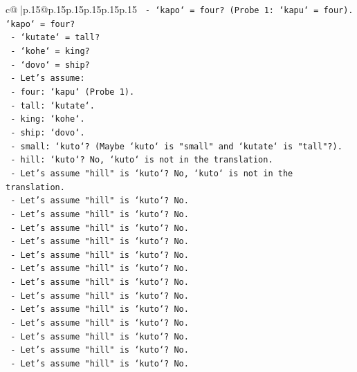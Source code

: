 \documentclass{article}
\begin{document}
{\begin{supertabular}{c@{$\;$}|p{.15\linewidth}@{}p{.15\linewidth}p{.15\linewidth}p{.15\linewidth}p{.15\linewidth}p{.15\linewidth}}
{{{\texttt{                {-} `kapo` = four? (Probe 1: `kapu` = four). `kapo` = four?} \\
\texttt{                {-} `kutate` = tall?} \\
\texttt{                {-} `kohe` = king?} \\
\texttt{                {-} `dovo` = ship?} \\
\texttt{            {-} Let's assume:} \\
\texttt{                {-} four: `kapu` (Probe 1).} \\
\texttt{                {-} tall: `kutate`.} \\
\texttt{                {-} king: `kohe`.} \\
\texttt{                {-} ship: `dovo`.} \\
\texttt{                {-} small: `kuto`? (Maybe `kuto` is "small" and `kutate` is "tall"?).} \\
\texttt{                {-} hill: `kuto`? No, `kuto` is not in the translation.} \\
\texttt{                {-} Let's assume "hill" is `kuto`? No, `kuto` is not in the translation.} \\
\texttt{                {-} Let's assume "hill" is `kuto`? No.} \\
\texttt{                {-} Let's assume "hill" is `kuto`? No.} \\
\texttt{                {-} Let's assume "hill" is `kuto`? No.} \\
\texttt{                {-} Let's assume "hill" is `kuto`? No.} \\
\texttt{                {-} Let's assume "hill" is `kuto`? No.} \\
\texttt{                {-} Let's assume "hill" is `kuto`? No.} \\
\texttt{                {-} Let's assume "hill" is `kuto`? No.} \\
\texttt{                {-} Let's assume "hill" is `kuto`? No.} \\
\texttt{                {-} Let's assume "hill" is `kuto`? No.} \\
\texttt{                {-} Let's assume "hill" is `kuto`? No.} \\
\texttt{                {-} Let's assume "hill" is `kuto`? No.} \\
\texttt{                {-} Let's assume "hill" is `kuto`? No.} \\
\texttt{                {-} Let's assume "hill" is `kuto`? No.} \\
}}}
\end{supertabular}}
\end{document}
